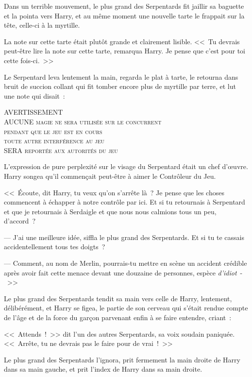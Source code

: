 Dans un terrible mouvement, le plus grand des Serpentards fit jaillir sa baguette et la pointa vers Harry, et au même moment une nouvelle tarte le frappait sur la tête, celle-ci à la myrtille.

La note sur cette tarte était plutôt grande et clairement lisible. <<~Tu devrais peut-être lire la note sur cette tarte, remarqua Harry. Je pense que c'est pour toi cette fois-ci.~>>

Le Serpentard leva lentement la main, regarda le plat à tarte, le retourna dans bruit de succion collant qui fit tomber encore plus de myrtille par terre, et lut une note qui disait~: \begin{center} \scshape \MakeUppercase{Avertissement}\\ \MakeUppercase{Aucune} magie ne sera utilisée sur le concurrent\\ pendant que le jeu est en cours\\ toute autre interférence au jeu\\ \MakeUppercase{sera} reportée aux autorités du jeu\end{center}

L'expression de pure perplexité sur le visage du Serpentard était un chef d'œuvre. Harry songea qu'il commençait peut-être à aimer le Contrôleur du Jeu.

<<~Écoute, dit Harry, tu veux qu'on s'arrête là~? Je pense que les choses commencent à échapper à notre contrôle par ici. Et si tu retournais à Serpentard et que je retournais à Serdaigle et que nous nous calmions tous un peu, d'accord~?

--- J'ai une meilleure idée, siffla le plus grand des Serpentards. Et si tu te cassais accidentellement tous tes doigts~?

--- Comment, au nom de Merlin, pourrais-tu mettre en scène un accident crédible après avoir fait cette menace devant une douzaine de personnes, espèce \emph{d'idiot}~-~>>

Le plus grand des Serpentards tendit sa main vers celle de Harry, lentement, délibérément, et Harry se figea, le partie de son cerveau qui s'était rendue compte de l'âge et de la force du garçon parvenant enfin à se faire entendre, criant~: 

<<~Attends~!~>> dit l'un des autres Serpentards, sa voix soudain paniquée. <<~Arrête, tu ne devrais pas le faire pour de vrai~!~>>

Le plus grand des Serpentards l'ignora, prit fermement la main droite de Harry dans sa main gauche, et prit l'index de Harry dans sa main droite.


